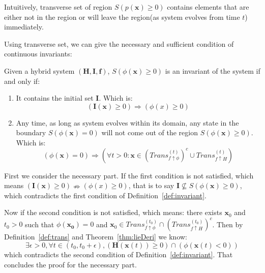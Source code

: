 \documentclass{jssc}
\begin{document}
Intuitively, transverse set of region $S(p(\boldsymbol{x}) \geq 0)$ contains elements that are either not in the region or will leave the region(as system evolves from time $t$) immediately.

Using transverse set, we can give the necessary and sufficient condition of continuous invariants:

\begin{theorem}
\label{thm:trans}
Given a hybrid system $(\boldsymbol{H}, \boldsymbol{I}, \boldsymbol{f})$, $S(\phi(\boldsymbol{x}) \geq 0)$ is an invariant of the system if and only if:
	\begin{enumerate}
		\item It contains the initial set $\boldsymbol{I}$. Which is: 
			\begin{equation*}
				(\boldsymbol{I}(\boldsymbol{x}) \geq 0) \Rightarrow (\phi(x) \geq 0)
			\end{equation*}
		\item Any time, as long as system evolves within its domain, any state in the boundary $S(\phi(\boldsymbol{x}) = 0)$ will not come out of the region $S(\phi(\boldsymbol{x}) \geq 0)$. Which is:
			\begin{equation*}
				(\phi(\boldsymbol{x}) = 0) \Rightarrow (\forall t>0: \boldsymbol{x} \in (Trans_{f \uparrow \phi}^{(t)})^c \cup Trans_{f \uparrow H}^{(t)})
			\end{equation*}
	\end{enumerate}
\end{theorem}

\proof
First we consider the necessary part. If the first condition is not satisfied, which means $(\boldsymbol{I}(\boldsymbol{x}) \geq 0) \nRightarrow (\phi(x) \geq 0)$, that is to say $\boldsymbol{I} \not\subseteq S(\phi(\boldsymbol{x}) \geq 0)$, which contradicts the first condition of Definition~\ref{def:invariant}.

Now if the second condition is not satisfied, which means: there exists $\boldsymbol{x}_0$ and $t_0 > 0$ such that $\phi(\boldsymbol{x_0}) = 0$ and $\boldsymbol{x}_0 \in Trans_{f \uparrow \phi}^{(t_0)} \cap (Trans_{f \uparrow H}^{(t_0)})^c$. Then by Definition~\ref{def:trans} and Theorem~\ref{thm:lieDeri} we know: 
\begin{equation*}
		\exists \epsilon > 0, \forall t \in (t_0, t_0 + \epsilon), (\boldsymbol{H}(\boldsymbol{x}(t)) \geq 0) \cap (\phi(\boldsymbol{x}(t) < 0))
\end{equation*}
which contradicts the second condition of Definition~\ref{def:invariant}. That concludes the proof for the necessary part.
\end{document}
